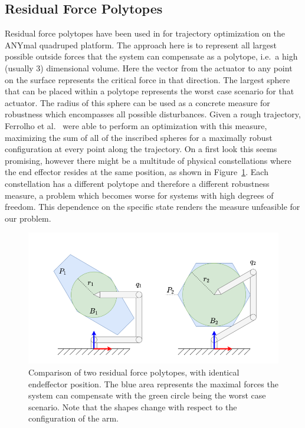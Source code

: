 \subsection{Residual Force Polytopes} \label{Residual Force Polytopes}
Residual force polytopes have been used in \cite{respoly} for trajectory optimization on the ANYmal quadruped platform. The approach here is to represent all largest possible outside forces that the system can compensate as a polytope, i.e.\ a high (usually 3) dimensional volume. Here the vector from the actuator to any point on the surface represents the critical force in that direction. The largest sphere that can be placed within a polytope represents the worst case scenario for that actuator. The radius of this sphere can be used as a concrete measure for robustness which encompasses all possible disturbances. Given a rough trajectory, Ferrolho et al.\ \cite{anytraj} were able to perform an optimization with this measure, maximizing the sum of all of the inscribed spheres for a maximally robust configuration at every point along the trajectory. 
On a first look this seems promising, however there might be a multitude of physical constellations where the end effector resides at the same position, as shown in Figure~\ref{fig:resforce}. Each constellation has a different polytope and therefore a different robustness measure, a problem which becomes worse for systems with high degrees of freedom. This dependence on the specific state renders the measure unfeasible for our problem.
\begin{figure}[ht]
    \centering
    \includegraphics[width=\linewidth]{figures/resdidual_force_polytope}
    \caption[Residual Force Polytopes]{Comparison of two residual force polytopes, with identical endeffector position. The blue area represents the maximal forces the system can compensate with the green circle being the worst case scenario. Note that the shapes change with respect to the configuration of the arm.\cite{respoly}}
    \label{fig:resforce}
\end{figure}


